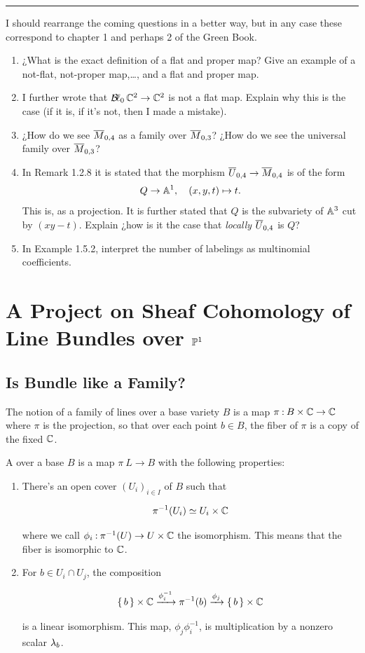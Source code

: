 \documentclass[12pt]{memoir}
\begin{document}
\hrule
I should rearrange the coming questions in a better way, but in any case these correspond to chapter 1 and perhaps 2 of the Green Book.

\begin{enumerate}
    \item ¿What is the exact definition of a flat and proper map? Give an example of a not-flat, not-proper map,\dots, and a flat and proper map.
    \item I further wrote that \(\operatorname{\mathcal{B}\!\ell}_0\mathbb{C}^2\to\mathbb{C}^2\) is not a flat map. Explain why this is the case (if it is, if it's not, then I made a mistake).
    \item ¿How do we see \(\overline{M}_{0,4}\) as a family over \(\overline{M}_{0,3}\)? ¿How do we see the universal family over \(\overline{M}_{0,3}\)?
    \item In Remark 1.2.8 it is stated that the morphism \(\overline{U}_{0,4}\to\overline{M}_{0,4}\) is of the form
          \[
              Q\to\mathbb{A}^1,\quad (x,y,t)\mapsto t.
          \]
          This is, as a projection. It is further stated that \(Q\) is the subvariety of \(\mathbb{A}^3\) cut by \((xy-t)\). Explain ¿how is it the case that \emph{locally} \(\overline{U}_{0,4}\) is \(Q\)?
    \item In Example 1.5.2, interpret the number of labelings as multinomial coefficients.
\end{enumerate}
\chapter{A Project on Sheaf Cohomology of Line Bundles over \(\mathbb{P}^1\)}


\section{Is Bundle like a Family?}

The notion of a family of lines over a base variety \(B\) is a map \(\pi\mathbin{:} B\times\mathbb{C}\to\mathbb{C}\) where \(\pi\) is the projection, so that over each point \(b\in B\), the fiber of \(\pi\) is a copy of the fixed \(\mathbb{C}\).

\begin{Def}
    A  over a base \(B\) is a map \(\pi\: L\to B\) with the following properties:
    \begin{enumerate}
        \item There's an open cover \((U_i)_{i\in I}\) of \(B\) such that

              \[\pi^{-1}(U_i)\simeq U_i\times\mathbb{C}\]

              where we call \(\phi_i\mathbin{:}\pi^{-1}(U)\to U\times\mathbb{C}\) the isomorphism. This means that the fiber is isomorphic to \(\mathbb{C}\).
        \item For \(b\in U_i\cap U_j\), the composition

              \[\{\,b\,\}\times\mathbb{C}\xrightarrow[]{\phi_i^{-1}}\pi^{-1}(b)\xrightarrow[]{\phi_j}\{\,b\,\}\times\mathbb{C}\]

              is a linear isomorphism. This map, \(\phi_j\phi_i^{-1}\), is multiplication by a nonzero scalar \(\lambda_b\).
    \end{enumerate}
\end{Def}
\end{document}
